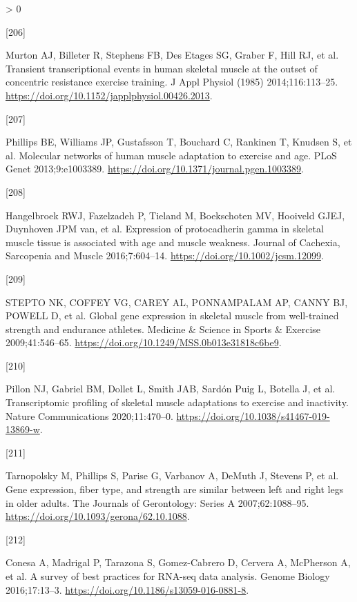 \documentclass[twoside,10pt]{gihclass} %
\newlength{\cslhangindent}
\newlength{\csllabelwidth}
\newenvironment{CSLReferences}[3] %
 {%
  \setlength{\parindent}{0pt}
  \ifodd #1 \everypar{\setlength{\hangindent}{\cslhangindent}}\ignorespaces\fi
  \ifnum #2 > 0
  \setlength{\parskip}{#2\baselineskip}
  \fi
 }%
 {}
\newcommand{\CSLLeftMargin}[1]{\parbox[t]{\maxof{\widthof{#1}}{\csllabelwidth}}{#1}}
\newcommand{\CSLRightInline}[1]{\parbox[t]{\linewidth}{#1}}
\begin{document}
\begin{CSLReferences}{0}{0}
\leavevmode\hypertarget{ref-RN2299}{}%
\CSLLeftMargin{{[}206{]} }
\CSLRightInline{Murton AJ, Billeter R, Stephens FB, Des Etages SG, Graber F, Hill RJ, et al. Transient transcriptional events in human skeletal muscle at the outset of concentric resistance exercise training. J Appl Physiol (1985) 2014;116:113--25. \url{https://doi.org/10.1152/japplphysiol.00426.2013}.}

\leavevmode\hypertarget{ref-RN753}{}%
\CSLLeftMargin{{[}207{]} }
\CSLRightInline{Phillips BE, Williams JP, Gustafsson T, Bouchard C, Rankinen T, Knudsen S, et al. Molecular networks of human muscle adaptation to exercise and age. PLoS Genet 2013;9:e1003389. \url{https://doi.org/10.1371/journal.pgen.1003389}.}

\leavevmode\hypertarget{ref-RN2402}{}%
\CSLLeftMargin{{[}208{]} }
\CSLRightInline{Hangelbroek RWJ, Fazelzadeh P, Tieland M, Boekschoten MV, Hooiveld GJEJ, Duynhoven JPM van, et al. Expression of protocadherin gamma in skeletal muscle tissue is associated with age and muscle weakness. Journal of Cachexia, Sarcopenia and Muscle 2016;7:604--14. \url{https://doi.org/10.1002/jcsm.12099}.}

\leavevmode\hypertarget{ref-RN2398}{}%
\CSLLeftMargin{{[}209{]} }
\CSLRightInline{STEPTO NK, COFFEY VG, CAREY AL, PONNAMPALAM AP, CANNY BJ, POWELL D, et al. Global gene expression in skeletal muscle from well-trained strength and endurance athletes. Medicine \& Science in Sports \& Exercise 2009;41:546--65. \url{https://doi.org/10.1249/MSS.0b013e31818c6be9}.}

\leavevmode\hypertarget{ref-RN2360}{}%
\CSLLeftMargin{{[}210{]} }
\CSLRightInline{Pillon NJ, Gabriel BM, Dollet L, Smith JAB, Sardón Puig L, Botella J, et al. Transcriptomic profiling of skeletal muscle adaptations to exercise and inactivity. Nature Communications 2020;11:470--0. \url{https://doi.org/10.1038/s41467-019-13869-w}.}

\leavevmode\hypertarget{ref-RN2403}{}%
\CSLLeftMargin{{[}211{]} }
\CSLRightInline{Tarnopolsky M, Phillips S, Parise G, Varbanov A, DeMuth J, Stevens P, et al. Gene expression, fiber type, and strength are similar between left and right legs in older adults. The Journals of Gerontology: Series A 2007;62:1088--95. \url{https://doi.org/10.1093/gerona/62.10.1088}.}

\leavevmode\hypertarget{ref-RN2426}{}%
\CSLLeftMargin{{[}212{]} }
\CSLRightInline{Conesa A, Madrigal P, Tarazona S, Gomez-Cabrero D, Cervera A, McPherson A, et al. A survey of best practices for RNA-seq data analysis. Genome Biology 2016;17:13--3. \url{https://doi.org/10.1186/s13059-016-0881-8}.}


\end{CSLReferences}
\end{document}
